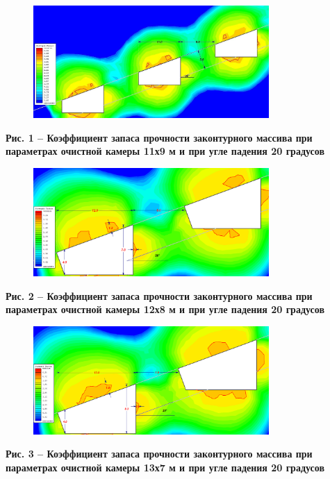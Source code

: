 \begin{figure}[H]
	\centering
	\includegraphics[width=0.8\textwidth]{assets/282}
	\caption*{}
\end{figure}

{\bfseries Рис. 1 -- Коэффициент запаса прочности законтурного массива при
параметрах очистной камеры 11х9 м и при угле падения 20 градусов}

\begin{figure}[H]
	\centering
	\includegraphics[width=0.8\textwidth]{assets/283}
	\caption*{}
\end{figure}

{\bfseries Рис. 2 -- Коэффициент запаса прочности законтурного массива при
параметрах очистной камеры 12х8 м и при угле падения 20 градусов}

\begin{figure}[H]
	\centering
	\includegraphics[width=0.8\textwidth]{assets/284}
	\caption*{}
\end{figure}

{\bfseries Рис. 3 -- Коэффициент запаса прочности законтурного массива при
параметрах очистной камеры 13х7 м и при угле падения 20 градусов}

